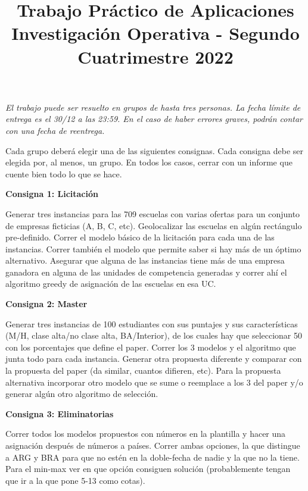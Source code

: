 \documentclass{article}
\title{Trabajo Práctico de Aplicaciones \\
\large Investigación Operativa - Segundo Cuatrimestre 2022}
\author{}
\date{}
\begin{document}
\maketitle

\textit{El trabajo puede ser resuelto en grupos de hasta tres personas. La fecha límite de entrega es el 30/12 a las 23:59. En el caso de haber errores graves, podrán contar con una fecha de reentrega.}

\vspace*{\baselineskip}

Cada grupo deberá elegir una de las siguientes consignas. Cada consigna debe ser elegida por, al menos, un grupo. En todos los casos, cerrar con un informe que cuente bien todo lo que se hace.
\vspace*{\baselineskip}


\textbf{Consigna 1: Licitación }

Generar tres instancias para las 709 escuelas con varias ofertas para un conjunto de empresas ficticias (A, B, C, etc). Geolocalizar las escuelas en algún rectángulo pre-definido. Correr el modelo básico de la licitación para cada una de las instancias. Correr también el modelo que permite saber si hay más de un óptimo alternativo. Asegurar que alguna de las instancias tiene más de una empresa ganadora en alguna de las unidades de competencia generadas y correr ahí el algoritmo greedy de asignación de las escuelas en esa UC.

\vspace*{\baselineskip}

\textbf{Consigna 2: Master }

Generar tres instancias de 100 estudiantes con sus puntajes y sus características (M/H, clase alta/no clase alta, BA/Interior), de los cuales hay que seleccionar 50 con los porcentajes que define el paper. Correr los 3 modelos y el algoritmo que junta todo para cada instancia. Generar otra propuesta diferente y comparar con la propuesta del paper (da similar, cuantos difieren, etc). Para la propuesta alternativa incorporar otro modelo que se sume o reemplace a los 3 del paper y/o generar algún otro algoritmo de selección.

\vspace*{\baselineskip}

\textbf{Consigna 3: Eliminatorias}

Correr todos los modelos propuestos con números en la plantilla y hacer una asignación después de números a países. Correr ambas opciones, la que distingue a ARG y BRA para que no estén en la doble-fecha de nadie y la que no la tiene. Para el min-max ver en que opción consiguen solución (probablemente tengan que ir a la que pone 5-13 como cotas).
\end{document}
